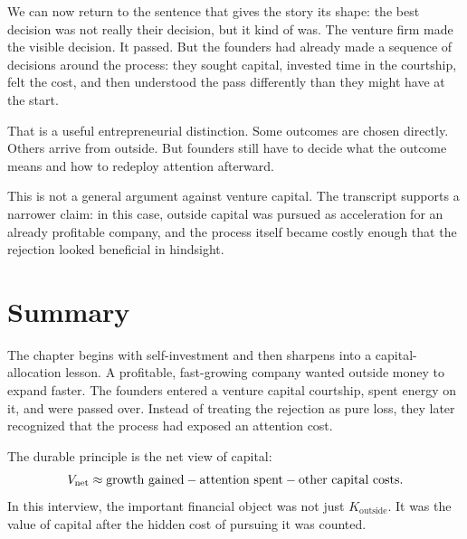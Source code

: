 We can now return to the sentence that gives the story its shape: the best decision was not really their decision, but it kind of was. The venture firm made the visible decision. It passed. But the founders had already made a sequence of decisions around the process: they sought capital, invested time in the courtship, felt the cost, and then understood the pass differently than they might have at the start.

That is a useful entrepreneurial distinction. Some outcomes are chosen directly. Others arrive from outside. But founders still have to decide what the outcome means and how to redeploy attention afterward.

\begin{remark}
This is not a general argument against venture capital. The transcript supports a narrower claim: in this case, outside capital was pursued as acceleration for an already profitable company, and the process itself became costly enough that the rejection looked beneficial in hindsight.
\end{remark}

\section{Summary}

The chapter begins with self-investment and then sharpens into a capital-allocation lesson. A profitable, fast-growing company wanted outside money to expand faster. The founders entered a venture capital courtship, spent energy on it, and were passed over. Instead of treating the rejection as pure loss, they later recognized that the process had exposed an attention cost.

The durable principle is the net view of capital:
\begin{equation}
V_{\mathrm{net}}
\approx
\hbox{growth gained}
-
\hbox{attention spent}
-
\hbox{other capital costs}.
\end{equation}
In this interview, the important financial object was not just \(K_{\mathrm{outside}}\). It was the value of capital after the hidden cost of pursuing it was counted.